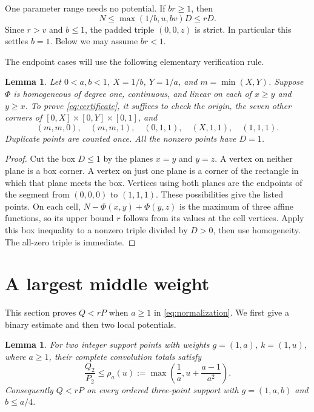 \documentclass[11pt,a4paper]{article}
\newtheorem{lemma}[theorem]{Lemma}
\theoremstyle{remark}
\begin{document}
One parameter range needs no potential. If $br\ge1$, then
\begin{equation}\label{eq:pointwise}
 N\le\max(1/b,u,bv)D\le rD.
\end{equation}
Since $r>v$ and $b\le1$, the padded triple $(0,0,z)$ is strict.
In particular this settles $b=1$. Below we may assume $br<1$.

The endpoint cases will use the following elementary verification rule.

\begin{lemma}\label{lem:vertices}
Let $0<a,b<1$, $X=1/b$, $Y=1/a$, and $m=\min(X,Y)$.
Suppose $\Phi$ is homogeneous of degree one, continuous, and linear on
each of $x\ge y$ and $y\ge x$. To prove \eqref{eq:certificate}, it
suffices to check the origin, the seven other corners of
$[0,X]\times[0,Y]\times[0,1]$, and
\[
 (m,m,0),\quad(m,m,1),\quad(0,1,1),\quad(X,1,1),\quad(1,1,1).
\]
Duplicate points are counted once. All the nonzero points have $D=1$.
\end{lemma}

\begin{proof}
Cut the box $D\le1$ by the planes $x=y$ and $y=z$.
A vertex on neither plane is a box corner. A vertex on just one
plane is a corner of the rectangle in which that plane meets the box.
Vertices using both planes are the endpoints of the segment from
$(0,0,0)$ to $(1,1,1)$. These possibilities give the listed points.
On each cell, $N-\Phi(x,y)+\Phi(y,z)$ is the maximum of three affine
functions, so its upper bound $r$ follows from its values at the cell
vertices. Apply this box inequality to a nonzero triple divided by
$D>0$, then use homogeneity. The all-zero triple is immediate.
\end{proof}

\section{A largest middle weight}\label{sec:middle}

This section proves $Q<rP$ when $a\ge1$ in
\eqref{eq:normalization}. We first give a binary estimate and then
two local potentials.

\begin{lemma}\label{lem:weighted-binary}
For two integer support points with weights $g=(1,a)$, $k=(1,u)$,
where $a\ge1$, their complete convolution totals satisfy
\[
 \frac{Q_2}{P_2}\le\rho_a(u)
 :=\max\left(\frac1a,u+\frac{a-1}{a^2}\right).
\]
Consequently $Q<rP$ on every ordered three-point support with
$g=(1,a,b)$ and $b\le a/4$.
\end{lemma}
\end{document}
